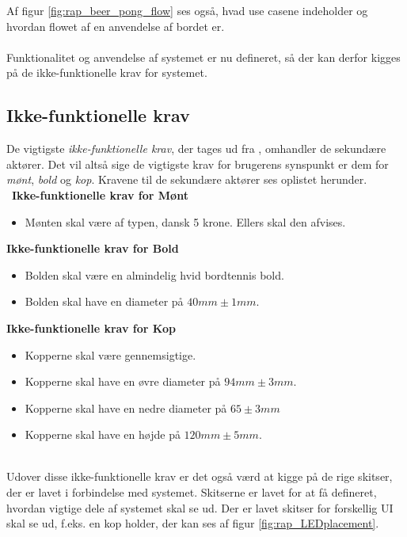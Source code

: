 \documentclass[Rapport/Rapport_main.tex]{subfiles}
\begin{document}
Af figur \ref{fig:rap_beer_pong_flow} ses også, hvad use casene indeholder og hvordan flowet af en anvendelse af bordet er.\\\\
Funktionalitet og anvendelse af systemet er nu defineret, så der kan derfor kigges på de ikke-funktionelle krav for systemet.

\subsection{Ikke-funktionelle krav}
De vigtigste \textit{ikke-funktionelle krav}, der tages ud fra , omhandler de sekundære aktører. Det vil altså sige de vigtigste krav for brugerens synspunkt er dem for \textit{mønt}, \textit{bold} og \textit{kop}. Kravene til de sekundære aktører ses oplistet herunder. \\\
\textbf{Ikke-funktionelle krav for Mønt}
\begin{itemize}
    \item Mønten skal være af typen, dansk 5 krone\cite{fiveKrCoin}. Ellers skal den afvises.
\end{itemize}
\textbf{Ikke-funktionelle krav for Bold}
\begin{itemize}
    \item Bolden skal være en almindelig hvid bordtennis bold\cite{pingpongball}.
    \item Bolden skal have en diameter på $40mm \pm{1mm}$.
\end{itemize}
\textbf{Ikke-funktionelle krav for Kop} 
\begin{itemize}
    \item Kopperne skal være gennemsigtige.
    \item Kopperne skal have en øvre diameter på $94mm \pm{3mm}$.
    \item Kopperne skal have en nedre diameter på $65 \pm{3mm}$
    \item Kopperne skal have en højde på $120mm \pm{5mm}$.
\end{itemize}\\
Udover disse ikke-funktionelle krav er det også værd at kigge på de rige skitser, der er lavet i forbindelse med systemet. Skitserne er lavet for at få defineret, hvordan vigtige dele af systemet skal se ud. Der er lavet skitser for forskellig UI skal se ud, f.eks. en kop holder, der kan ses af figur \ref{fig:rap_LEDplacement}.
\end{document}
